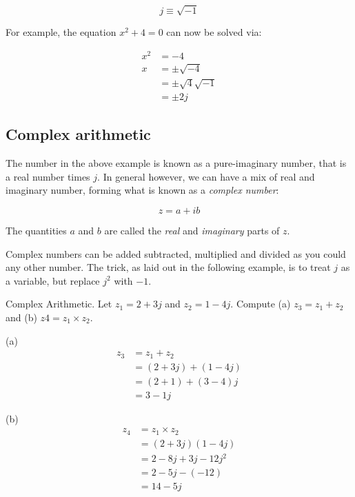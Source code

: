 \documentclass{tufte-book}
\begin{document}
\begin{equation}\label{def_imagnum}
j \equiv \sqrt{-1}
\end{equation}

\noindent For example, the equation $x^2 + 4 = 0$ can now be solved via:

\begin{align*}
x^2 &= -4 \\
x &= \pm \sqrt{-4}  \\
&= \pm \sqrt{4}\sqrt{-1} \\
&= \pm2j
\end{align*}

\subsection{Complex arithmetic}
The number in the above example is known as a pure-imaginary number, that is a real number times $j$. In general however, we can have a mix of real and imaginary number, forming what is known as a \textit{complex number}:

\begin{equation}\label{def:cpxnum}
z = a + ib
\end{equation}

\noindent The quantities $a$ and $b$ are called the \textit{real} and \textit{imaginary} parts of $z$.

Complex numbers can be added subtracted, multiplied and divided as you could any other number. The trick, as laid out in the following example, is to treat $j$ as a variable, but replace $j^2$ with $-1$.

\begin{myexample}[label = ex:its_complicated]{Complex Arithmetic.}
Let $z_1 = 2+3j$ and $z_2 = 1-4j$. Compute (a) $z_3 = z_1 + z_2$ and (b) $z4 = z_1\times z_2$.

(a) \begin{align*}
z_3  &= z_1+z_2 \\
& = \left(2+3j\right) + \left(1-4j\right) \\
&=  \left(2+1\right) + (3-4)j \\
&= 3 -1j
\end{align*}

(b)\begin{align*}
z_4  &= z_1\times z_2 \\
& = \left(2+3j\right) \left(1-4j\right) \\
&=  2 - 8j + 3j -12j^2 \\
&= 2 - 5j -(-12) \\
&= 14-5j
\end{align*}
\end{myexample}
\end{document}
